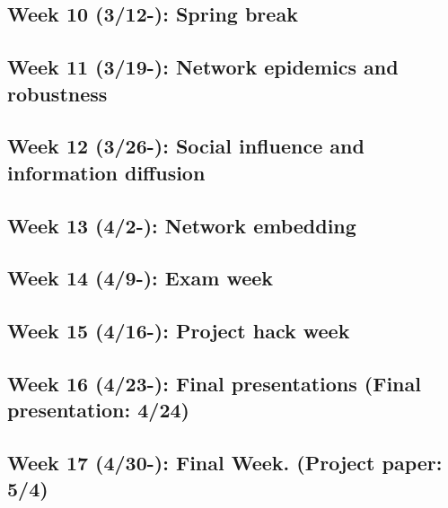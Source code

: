 \documentclass[11pt,article,oneside]{memoir} %
\begin{document}
\subsection{\color{gray}Week 10 (3/12-): Spring break}
\subsection{Week 11 (3/19-): Network epidemics and robustness}
\subsection{Week 12 (3/26-): Social influence and information diffusion}
\subsection{Week 13 (4/2-): Network embedding}
\subsection{Week 14 (4/9-): Exam week}
\subsection{Week 15 (4/16-): Project hack week}
\subsection{Week 16 (4/23-): Final presentations (Final presentation: 4/24)}
\subsection{Week 17 (4/30-): Final Week. (Project paper: 5/4)}

\end{document}
